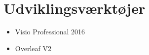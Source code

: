 \section{Udviklingsværktøjer}
\begin{itemize}
    \item Visio Professional 2016
    \item Overleaf V2
\end{itemize}